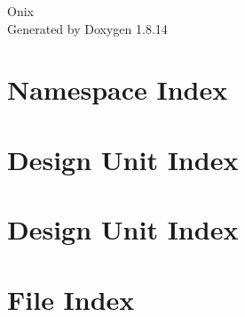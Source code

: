 \documentclass[twoside]{book}
\newcommand{\+}{\discretionary{\mbox{\scriptsize$\hookleftarrow$}}{}{}}
\newcommand{\clearemptydoublepage}{%
  \newpage{\pagestyle{empty}\cleardoublepage}%
}
\begin{document}
\hypersetup{pageanchor=false,
             bookmarksnumbered=true,
             pdfencoding=unicode
            }
\begin{titlepage}
\vspace*{7cm}
\begin{center}%
{\Large Onix }\\
\vspace*{1cm}
{\large Generated by Doxygen 1.8.14}\\
\end{center}
\end{titlepage}
\clearemptydoublepage
{}
\tableofcontents
\clearemptydoublepage
{}
\hypersetup{pageanchor=true}

\chapter{Namespace Index}

\chapter{Design Unit Index}

\chapter{Design Unit Index}

\chapter{File Index}

\end{document}
